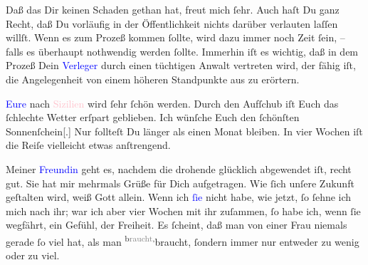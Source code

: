 \pstart
           Daß das \label{K_L03442-2v}\label{K_L03442-2h} Dir keinen Schaden gethan hat, freut mich ſehr. Auch haſt Du ganz Recht, daß
               Du vorläufig in der Öffentlichkeit nichts darüber verlauten laſſen willſt. Wenn es
               zum Prozeß kommen ſollte, wird dazu immer noch Zeit ſein, – falls es überhaupt
               nothwendig werden ſollte. Immerhin iſt es wichtig, daß in dem Prozeß Dein \textcolor{brown}{\textcolor{blue}{Verleger}{}\ledrightnote{\textcolor{blue}{Fritz Freund}}}{}\ledrightnote{{$\rightarrow$}\textcolor{brown}{Wiener Verlag}} durch einen tüchtigen Anwalt vertreten wird, der  fähig {\pb}iſt, die Angelegenheit von einem
               höheren Standpunkte aus zu erörtern.\pend
           
\pstart
           \textcolor{blue}{Eure}{}\ledrightnote{{$\rightarrow$}\textcolor{blue}{Olga Schnitzler}}{ }\label{K_L03442-17v}\label{K_L03442-17h} nach \textcolor{pink}{Sizilien}{}\ledrightnote{\textcolor{pink}{Sizilien}} wird ſehr ſchön werden.
               Durch den Aufſchub iſt Euch das ſchlechte Wetter erſpart geblieben. Ich wünſche Euch
               den ſchönſten Sonnenſchein{[}.{]} Nur follteſt Du länger als einen
               Monat bleiben. In vier Wochen iſt die Reiſe vielleicht etwas anſtrengend.\pend
           
\pstart
           Meiner \textcolor{blue}{Freundin}{}\ledrightnote{{$\rightarrow$}\textcolor{blue}{Theodore Rottenberg}} geht es,
               nachdem die drohende \label{K_L03442-13v}\label{K_L03442-13h}{ } glücklich abgewendet iſt, recht gut. Sie hat mir
                   mehrmals Grüße für Dich aufgetragen. Wie
               ſich unſere Zukunft geſtalten wird, weiß Gott allein. Wenn {\pb} ich \textcolor{blue}{ſie}{}\ledrightnote{{$\rightarrow$}\textcolor{blue}{Theodore Rottenberg}} nicht habe,
               wie jetzt, ſo ſehne ich mich nach ihr; war ich aber vier Wochen mit ihr zuſammen, ſo
               habe ich, wenn ſie wegfährt, ein Gefühl,  der Freiheit. Es ſcheint, daß man von einer Frau niemals gerade ſo viel hat,
               als man \substVorne{}\textsuperscript{b\textcolor{gray}{raucht},}{\allowbreak}\substDazwischen{}braucht,\substHinten{} ſondern immer nur entweder zu wenig oder zu viel.\pend
           

